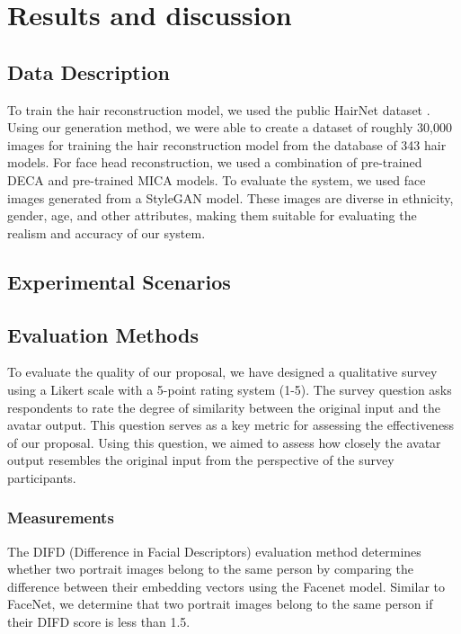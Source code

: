 \section{Results and discussion}
\label{sec:results}

\subsection{Data Description}
To train the hair reconstruction model, we used the public HairNet dataset \cite{zhouHairNetSingleViewHair2018}. Using our generation method, we were able to create a dataset of roughly 30,000 images for training the hair reconstruction model from the database of 343 hair models.
For face head reconstruction, we used a combination of pre-trained DECA \cite{fengLearningAnimatableDetailed2021} and pre-trained MICA \cite{zielonkaMetricalReconstructionHuman2022}  models.
To evaluate the system, we used face images generated from a StyleGAN \cite{karrasStyleBasedGeneratorArchitecture2019} model. These images are diverse in ethnicity, gender, age, and other attributes, making them suitable for evaluating the realism and accuracy of our system.

\subsection{Experimental Scenarios}

\subsection{Evaluation Methods}
To evaluate the quality of our proposal, we have designed a qualitative survey using a Likert scale with a 5-point rating system (1-5). The survey question asks respondents to rate the degree of similarity between the original input and the avatar output. This question serves as a key metric for assessing the effectiveness of our proposal.
Using this question, we aimed to assess how closely the avatar output resembles the original input from the perspective of the survey participants. 
\subsubsection{Measurements}
The DIFD (Difference in Facial Descriptors) evaluation method determines whether two portrait images belong to the same person by comparing the difference between their embedding vectors using the Facenet model. Similar to FaceNet, we determine that two portrait images belong to the same person if their DIFD score is less than 1.5.
% 

